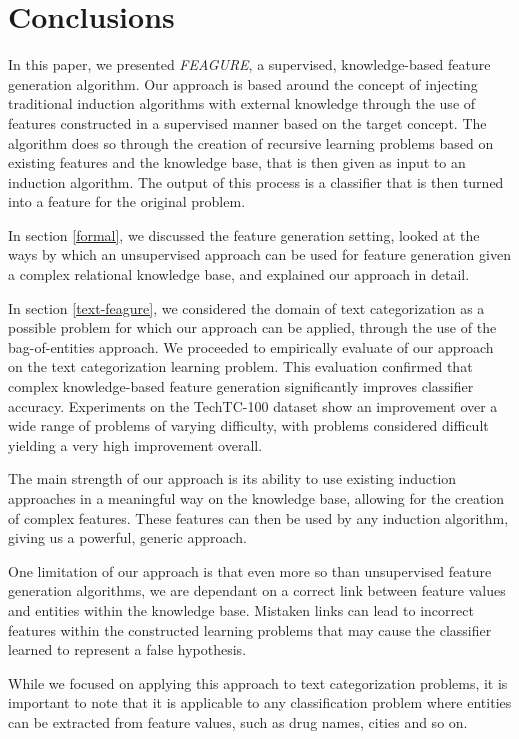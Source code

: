 \documentclass[twoside,11pt]{article}
\theoremstyle{definition}
\begin{document}


\section{Conclusions}

In this paper, we presented \emph{FEAGURE}, a supervised, knowledge-based feature generation algorithm. Our approach is based around the concept of injecting traditional induction algorithms with external knowledge through the use of features constructed in a supervised manner based on the target concept. 
The algorithm does so through the creation of recursive learning problems based on existing features and the knowledge base, that is then given as input to an induction algorithm. The output of this process is a classifier that is then turned into a feature for the original problem.

In section \ref{formal}, we discussed the feature generation setting, looked at the ways by which an unsupervised approach can be used for feature generation given a complex relational knowledge base, and explained our approach in detail.

In section \ref{text-feagure}, we considered the domain of text categorization as a possible problem for which our approach can be applied, through the use of the bag-of-entities approach. We proceeded to empirically evaluate of our approach on the text categorization learning problem.
This evaluation confirmed that complex knowledge-based feature generation significantly improves classifier accuracy. Experiments on the TechTC-100 dataset show an improvement over a wide range of problems of varying difficulty, with problems considered difficult yielding a very high improvement overall.

The main strength of our approach is its ability to use existing induction approaches in a meaningful way on the knowledge base, allowing for the creation of complex features. These features can then be used by any induction algorithm, giving us a powerful, generic approach.

One limitation of our approach is that even more so than unsupervised feature generation algorithms,  we are dependant on a correct link between feature values and entities within the knowledge base. Mistaken links can lead to incorrect features within the constructed learning problems that may cause the classifier learned to represent a false hypothesis. 

While we focused on applying this approach to text categorization problems, it is important to note that it is applicable to any classification problem where entities can be extracted from feature values, such as drug names, cities and so on. 

\clearpage
\vskip 0.2in


\end{document}
